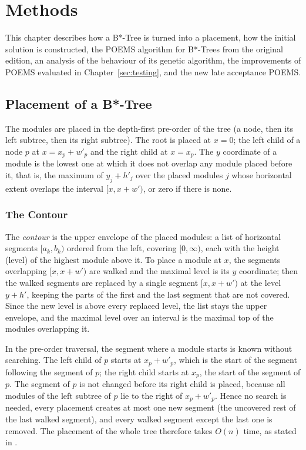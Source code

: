 \chapter{Methods}
\label{sec:approach}

This chapter describes how a B*-Tree is turned into a placement, how the initial solution is constructed, the POEMS algorithm for B*-Trees from the original edition, an analysis of the behaviour of its genetic algorithm, the improvements of POEMS evaluated in Chapter~\ref{sec:testing}, and the new late acceptance POEMS.

\section{Placement of a B*-Tree}
\label{sec:placement}

The modules are placed in the depth-first pre-order of the tree (a node, then its left subtree, then its right subtree). The root is placed at $x = 0$; the left child of a node $p$ at $x = x_p + w'_p$ and the right child at $x = x_p$. The $y$ coordinate of a module is the lowest one at which it does not overlap any module placed before it, that is, the maximum of $y_j + h'_j$ over the placed modules $j$ whose horizontal extent overlaps the interval $[x, x + w')$, or zero if there is none.

\subsection{The Contour}

The {\em contour} is the upper envelope of the placed modules: a list of horizontal segments $[a_k, b_k)$ ordered from the left, covering $[0, \infty)$, each with the height (level) of the highest module above it. To place a module at $x$, the segments overlapping $[x, x + w')$ are walked and the maximal level is its $y$ coordinate; then the walked segments are replaced by a single segment $[x, x + w')$ at the level $y + h'$, keeping the parts of the first and the last segment that are not covered. Since the new level is above every replaced level, the list stays the upper envelope, and the maximal level over an interval is the maximal top of the modules overlapping it.

In the pre-order traversal, the segment where a module starts is known without searching. The left child of $p$ starts at $x_p + w'_p$, which is the start of the segment following the segment of $p$; the right child starts at $x_p$, the start of the segment of $p$. The segment of $p$ is not changed before its right child is placed, because all modules of the left subtree of $p$ lie to the right of $x_p + w'_p$. Hence no search is needed, every placement creates at most one new segment (the uncovered rest of the last walked segment), and every walked segment except the last one is removed. The placement of the whole tree therefore takes $O(n)$ time, as stated in \cite{otree,btree}.

